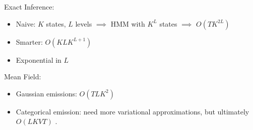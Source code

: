 \begin{frame}

Exact Inference: \\
\begin{itemize}
\item Naive: $K$ states, $L$ levels $\implies$ HMM with $K^L$ states $\implies$  $O(TK^{2L})$ 
    \item Smarter: $O(KLK^{L+1})$
    \item Exponential in $L$
\end{itemize}
\air

Mean Field: \\
\begin{itemize}
    \item Gaussian emissions: $O(TLK^2)$
    \item Categorical emission: need more variational approximations, but ultimately $O(LKVT)$ \citep{nepal2013}.
\end{itemize}
\end{frame}







